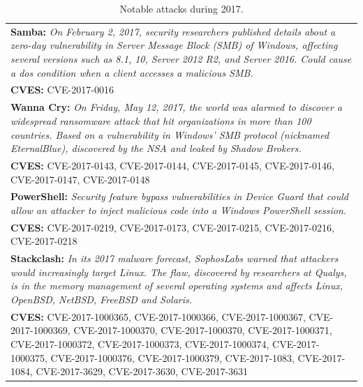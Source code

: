\begin{table}[t]
\begin{center}
{%
\footnotesize
\begin{tabular}{ | p{} | }\hline

\textbf{Samba:} 
\emph{On February 2, 2017, security researchers published details about a zero-day vulnerability in Server Message Block (SMB) of Windows, affecting several versions such as 8.1, 10, Server 2012 R2, and Server 2016. 
Could cause a \gls{dos} condition when a client accesses a malicious SMB.}\\
\textbf{CVES:} 
CVE-2017-0016
\\ \hline

\textbf{Wanna Cry:} 
\emph{On Friday, May 12, 2017, the world was alarmed to discover a widespread ransomware attack that hit organizations in more than 100 countries. Based on a vulnerability in Windows' SMB protocol (nicknamed EternalBlue), discovered by the NSA and leaked by Shadow Brokers.} \\
\textbf{CVES:} 
CVE-2017-0143, CVE-2017-0144, CVE-2017-0145, CVE-2017-0146, CVE-2017-0147, CVE-2017-0148 \\ \hline

\textbf{PowerShell:} 
\emph{Security feature bypass vulnerabilities in Device Guard that could allow an attacker to inject malicious code into a Windows PowerShell session.} \\
\textbf{CVES:}
CVE-2017-0219, CVE-2017-0173, CVE-2017-0215, CVE-2017-0216, CVE-2017-0218\\ \hline

\textbf{Stackclash:} 
\emph{In its 2017 malware forecast, SophosLabs warned that attackers would increasingly target Linux. The flaw, discovered by researchers at Qualys, is in the memory management of several operating systems and affects Linux, OpenBSD, NetBSD, FreeBSD and Solaris.}\\
\textbf{CVES:}
CVE-2017-1000365, CVE-2017-1000366, CVE-2017-1000367, CVE-2017-1000369, CVE-2017-1000370, CVE-2017-1000370, CVE-2017-1000371, CVE-2017-1000372, CVE-2017-1000373, CVE-2017-1000374, CVE-2017-1000375, CVE-2017-1000376, CVE-2017-1000379, CVE-2017-1083, CVE-2017-1084, CVE-2017-3629, CVE-2017-3630, CVE-2017-3631\\ \hline

\end{tabular}
}
\caption{Notable attacks during 2017.}
\label{tab:special_vulns}
\end{center}
\end{table}

